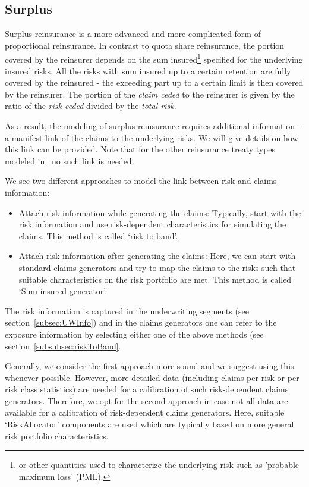 \subsection{Surplus}
\label{subsec:Surplus}

Surplus reinsurance is a more advanced and more complicated form of proportional reinsurance. In contrast to quota share reinsurance, the portion covered by the reinsurer depends on the sum insured\footnote{or other quantities used to characterize the underlying risk such as 'probable maximum loss' (PML).} specified for the underlying insured risks. All the risks with sum insured up to a certain retention are fully covered by the reinsured - the exceeding part up to a certain limit is then covered by the reinsurer. The portion of the {\it claim ceded} to the reinsurer is given by the ratio of the {\it risk ceded} divided by the {\it total risk}. 

As a result, the modeling of surplus reinsurance requires additional information - a manifest link of the claims to the underlying risks. We will give details on how this link can be provided. Note that for the other reinsurance treaty types modeled in \RA\ no such link is needed.  

We see two different approaches to model the link between risk and claims information:
\begin{itemize}
	\item Attach risk information while generating the claims: Typically, start with the risk information and use risk-dependent characteristics for simulating the claims. This method is called `risk to band'.
	\item Attach risk information after generating the claims: Here, we can start with standard claims generators and try to map the claims to the risks such that suitable characteristics on the risk portfolio are met. This method is called `Sum insured generator'.
\end{itemize}

The risk information is captured in the underwriting segments (see section~\ref{subsec:UWInfo}) and in the claims generators one can refer to the exposure information by selecting either one of the above methods (see section~\ref{subsubsec:riskToBand}.

Generally, we consider the first approach more sound and we suggest using this whenever possible. However, more detailed data (including claims per risk or per risk class statistics) are needed for a calibration of such risk-dependent claims generators. Therefore, we opt for the second approach in case not all data are available for a calibration of risk-dependent claims generators. Here, suitable `RiskAllocator' components are used which are typically based on more general risk portfolio characteristics.

